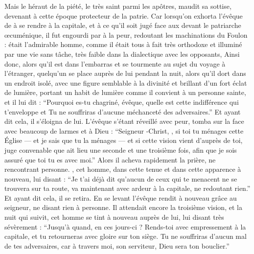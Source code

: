 Mais le héraut de la piété,   le très saint parmi les apôtres, maudit sa sottise,  devenant à cette époque protecteur de la patrie.
Car lorsqu'on exhorta  l'évêque de  à se rendre à la capitale, et à ce qu'il soit jugé face aux  devant le patriarche œcuménique, il fut engourdi par  à la peur, redoutant les machinations du Foulon : 
 était l'admirable homme, comme il était tous à fait très orthodoxe et illuminé par  une vie sans tâche, très faible dans la dialectique avec les opposants,
Ainsi donc, alors qu'il est dans l'embarras et se tourmente au sujet du voyage à l'étranger, 
quelqu'un se place auprès de lui pendant la nuit,
alors qu'il dort dans un endroit isolé,
avec une figure semblable à la divinité et brillant d'un fort éclat de lumière, 
portant un habit de lumière comme il convient à un personne sainte, 
et il lui dit 
 : %
\enquote{Pourquoi es-tu chagriné, évêque, quelle est cette indifférence qui t'enveloppe et 
Tu ne souffriras d'aucune méchanceté des adversaires.}
Et ayant dit cela, il s'éloigna de lui.
L'évêque  s'étant réveillé avec peur, tomba sur la face avec beaucoup de larmes et  à Dieu : 
\enquote{Seigneur -Christ, ,
si toi tu ménages cette Église --- et je sais que tu la ménages ---
et si cette vision vient d'auprès de toi, juge convenable que  ait lieu une seconde et une troisième fois, afin que je sois assuré que toi tu es avec moi.}
Alors il acheva rapidement la prière, ne rencontrant personne.
, cet homme, dans cette tenue et dans cette apparence  à nouveau, lui disant :
\enquote{Je t'ai déjà dit qu'aucun de ceux qui te menacent ne se trouvera sur ta route, 
va maintenant avec ardeur à la capitale, ne redoutant rien.}
Et ayant dit cela, il se retira.
En se levant l'évêque rendit à nouveau grâce au seigneur, ne disant rien à personne.
Il attendait encore la troisième vision, et la nuit qui suivit, cet homme se tint à nouveau auprès de lui, lui disant très sévèrement :
\enquote{Jusqu'à quand,  en ces jours-ci ? Rends-toi avec empressement à la capitale, et tu retourneras avec gloire sur ton siège. 
Tu ne souffriras d'aucun mal de tes adversaires, car à travers moi, son serviteur, Dieu sera ton bouclier.}
